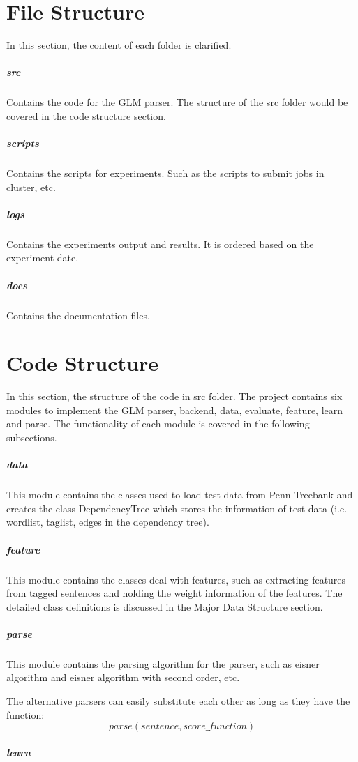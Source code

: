 \documentclass[11pt]{article}
\begin{document}
\setlength{\parindent}{0pt}

\section{File Structure}

In this section, the content of each folder is clarified.

\subparagraph{src}
Contains the code for the GLM parser. The structure of the src folder would be covered in the code structure section.

\subparagraph{scripts}
Contains the scripts for experiments. Such as the scripts to submit jobs in cluster, etc.

\subparagraph{logs}
Contains the experiments output and results. It is ordered based on the experiment date.

\subparagraph{docs}
Contains the documentation files.



\section{Code Structure}

In this section, the structure of the code in src folder. The project contains six modules to implement the GLM parser, backend, data, evaluate, feature, learn and parse. The functionality of each module is covered in the following subsections.

\subparagraph{data}

This module contains the classes used to load test data from Penn Treebank and creates the class DependencyTree which stores the information of test data (i.e. wordlist, taglist, edges in the dependency tree).

\subparagraph{feature}

This module contains the classes deal with features, such as extracting features from tagged sentences and holding the weight information of the features. The detailed class definitions is discussed in the Major Data Structure section.

\subparagraph{parse}

This module contains the parsing algorithm for the parser, such as eisner algorithm and eisner algorithm with second order, etc. 

The alternative parsers can easily substitute each other as long as they have the function: 
	$$ parse(sentence, score\_function) $$

\subparagraph{learn}
\end{document}
